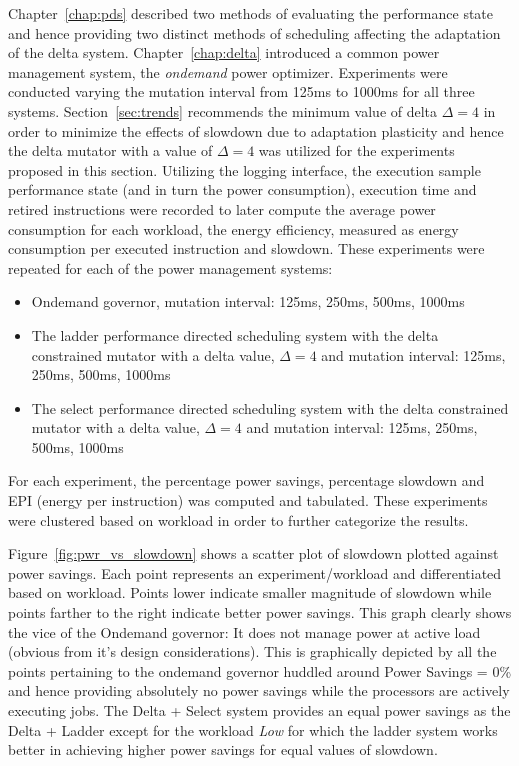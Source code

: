 Chapter~\ref{chap:pds} described two methods of evaluating the performance state and hence
providing two distinct methods of scheduling affecting the adaptation of the delta system.
Chapter~\ref{chap:delta} introduced a common power management system, the \textit{ondemand}
power optimizer. Experiments were conducted varying the mutation interval from 125ms to
1000ms for all three systems. Section~\ref{sec:trends} recommends the minimum value of 
delta $\Delta = 4$ in order to minimize the effects of slowdown due to adaptation plasticity
and hence the delta mutator with a value of $\Delta = 4$ was utilized for the experiments
proposed in this section. 
Utilizing the logging interface, the execution sample 
performance state (and in turn the power consumption), execution time and retired instructions 
were recorded to later compute the average power consumption for each workload, the energy
efficiency, measured as energy consumption per executed instruction and slowdown. 
These experiments were repeated for each of the power management systems:
\begin{itemize}
\item Ondemand governor, mutation interval: 125ms, 250ms, 500ms, 1000ms
\item The ladder performance directed scheduling system with the delta constrained mutator with 
a delta value, $\Delta = 4$ and mutation interval: 125ms, 250ms, 500ms, 1000ms
\item The select performance directed scheduling system with the delta constrained mutator with 
a delta value, $\Delta = 4$ and mutation interval: 125ms, 250ms, 500ms, 1000ms
\end{itemize}
For each experiment, the percentage power savings, percentage slowdown and EPI (energy per instruction)
was computed and tabulated. These experiments were clustered based on workload in order to further 
categorize the results.

Figure~\ref{fig:pwr_vs_slowdown} shows a scatter plot of slowdown plotted against power savings. Each point
represents an experiment/workload and differentiated based on workload. 
Points lower indicate smaller magnitude of slowdown while points farther to the right indicate better power
savings. This graph clearly shows the vice of the Ondemand governor: It does not manage power at active
load (obvious from it's design considerations). This is graphically depicted by all the points pertaining
to the ondemand governor huddled around Power Savings = 0\% and hence providing absolutely no power savings
while the processors are actively executing jobs. The Delta + Select system provides an equal power savings
as the Delta + Ladder except for the workload \textit{Low} for which the ladder system works better in achieving
higher power savings for equal values of slowdown.

